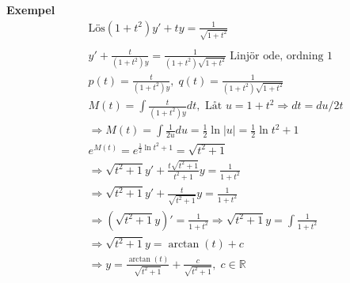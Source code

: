 \textbf{Exempel} 
\begin{align*}
  &\quad  \text{Lös} (1+t^2)y' + ty = \frac{1}{\sqrt{1+t^2}} \\
  &\quad  \\
  &\quad  y'+\frac{t}{(1+t^2)y} = \frac{1}{(1+t^2)\sqrt{1+t^2}} \text{ Linjör ode, ordning 1} \\
  &\quad  p(t)=\frac{t}{(1+t^2)y}, \; q(t)=\frac{1}{(1+t^2)\sqrt{1+t^2}} \\
  &\quad  M(t) = \int \frac{t}{(1+t^2)y}dt, \text{ Låt } u=1+t^2 \Rightarrow dt = du/2t \\
  &\quad  \Rightarrow M(t)=\int\frac{1}{2u}du = \frac{1}{2}\ln{|u|} = \frac{1}{2}\ln{t^2+1} \\
  &\quad  e^{M(t)}=e^{\frac{1}{2}\ln{t^2+1}}=\sqrt{t^2+1} \\
  &\quad  \Rightarrow \sqrt{t^2+1}y'+\frac{t\sqrt{t^2+1}}{t^2+1}y = \frac{1}{1+t^2} \\
  &\quad  \Rightarrow \sqrt{t^2+1}y'+\frac{t}{\sqrt{t^2+1}}y = \frac{1}{1+t^2} \\
  &\quad  \Rightarrow (\sqrt{t^2+1}y)' = \frac{1}{1+t^2} \Rightarrow \sqrt{t^2+1}y = \int\frac{1}{1+t^2} \\
  &\quad  \Rightarrow \sqrt{t^2+1}y = \arctan{(t)} +c \\
  &\quad  \Rightarrow y = \frac{\arctan{(t)}}{\sqrt{t^2+1}} +\frac{c}{{\sqrt{t^2+1}}}, \; c\in\mathbb{R} \\
\end{align*}




